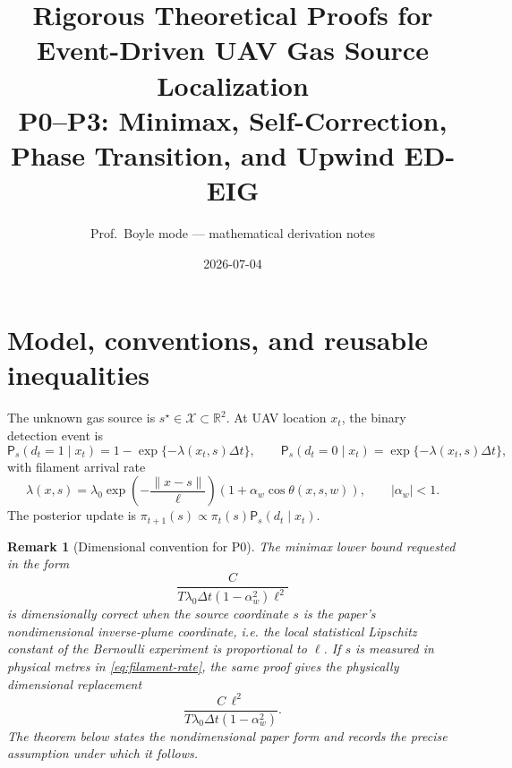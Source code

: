 \documentclass[11pt]{article}
\newtheorem{remark}[theorem]{Remark}
\newcommand{\X}{\mathcal{X}}
\newcommand{\R}{\mathbb{R}}
\newcommand{\dt}{\Delta t}
\newcommand{\law}{\mathsf{P}}
\begin{document}
\title{Rigorous Theoretical Proofs for Event-Driven UAV Gas Source Localization\\
\large P0--P3: Minimax, Self-Correction, Phase Transition, and Upwind ED-EIG}
\author{Prof.\ Boyle mode --- mathematical derivation notes}
\date{2026-07-04}
\maketitle

\section{Model, conventions, and reusable inequalities}

The unknown gas source is $s^\star\in\X\subset\R^2$.  At UAV location $x_t$, the binary detection event is
\begin{equation}
        \law_s(d_t=1\mid x_t)=1-\exp\{-\lambda(x_t,s)\dt\},\qquad
        \law_s(d_t=0\mid x_t)=\exp\{-\lambda(x_t,s)\dt\},
        \label{eq:binary-model}
\end{equation}
with filament arrival rate
\begin{equation}
        \lambda(x,s)
        =
        \lambda_0
        \exp\!\left(-\frac{\|x-s\|}{\ell}\right)
        \left(1+\alpha_w\cos\theta(x,s,w)\right),
        \qquad |\alpha_w|<1.
        \label{eq:filament-rate}
\end{equation}
The posterior update is $\pi_{t+1}(s)\propto \pi_t(s)\law_s(d_t\mid x_t)$.

\begin{remark}[Dimensional convention for P0]
The minimax lower bound requested in the form
\[
        \frac{C}{T\lambda_0\dt(1-\alpha_w^2)\ell^2}
\]
is dimensionally correct when the source coordinate $s$ is the paper's nondimensional inverse-plume coordinate, i.e. the local statistical Lipschitz constant of the Bernoulli experiment is proportional to $\ell$.  If $s$ is measured in physical metres in \eqref{eq:filament-rate}, the same proof gives the physically dimensional replacement
\[
        \frac{C\,\ell^2}{T\lambda_0\dt(1-\alpha_w^2)}.
\]
The theorem below states the nondimensional paper form and records the precise assumption under which it follows.
\end{remark}
\end{document}
